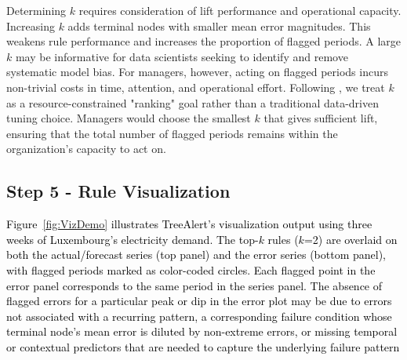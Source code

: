 \documentclass[12pt]{article}
\newcommand{\matt}[1]{\textcolor{black}{#1}}
\begin{document}
Determining $k$ requires consideration of lift performance and operational capacity. Increasing $k$ adds %
terminal nodes with %
smaller mean error magnitudes. This weakens rule performance and increases the proportion of flagged periods. A large $k$ may be informative for data scientists seeking to identify and remove systematic model bias. For managers, however, acting on flagged periods incurs non-trivial costs in time, attention, and operational effort. Following \citet{shmueli2024machine}, we treat $k$ as a resource-constrained "ranking" goal rather than a traditional data-driven tuning choice. %
Managers would choose the smallest $k$ that gives sufficient lift, %
ensuring that the total number of flagged periods remains within the organization's capacity to act on.


\subsection{Step 5 - Rule Visualization}
\label{subsec-step5}

\matt{Figure~\ref{fig:VizDemo} illustrates TreeAlert's visualization output using three weeks of Luxembourg's electricity demand. The top-$k$ rules ($k$=2) are overlaid on both the actual/forecast series (top panel) and the error series (bottom panel), with flagged periods marked as color-coded circles. Each flagged point in the error panel corresponds to the same period in the series panel. The absence of flagged errors for a particular peak or dip in the error plot may be due to errors not associated with a recurring pattern, a corresponding failure condition whose terminal node's mean error is diluted by non-extreme errors, or missing temporal or contextual predictors that are needed to capture the underlying failure pattern}
\end{document}
